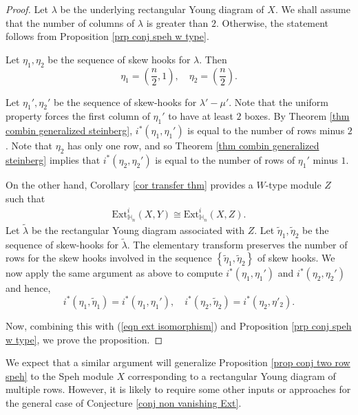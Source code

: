 \documentclass[11pt]{amsart}
\numberwithin{equation}{section}
\theoremstyle{definition}
\begin{document}
\begin{proof}
Let $\lambda$ be the underlying rectangular Young diagram of $X$. We shall assume that the number of columns of \(\lambda\) is greater than $2$. Otherwise, the statement follows from Proposition \ref{prp conj speh w type}.

Let $\eta_1, \eta_2$ be the sequence of skew hooks for $\lambda$. Then 
\[ \eta_1=(\frac{n}{2},1 ), \quad \eta_2=(\frac{n}{2} ) . \]


Let $\eta_1', \eta_2'$ be the sequence of skew-hooks for $\lambda'-\mu'$. Note that the uniform property forces the first column of $\eta_1'$ to have at least $2$ boxes. By Theorem \ref{thm combin generalized steinberg}, $i^*(\eta_1, \eta_1')$ is equal to the number of rows minus $2$. Note that $\eta_2$ has only one row, and so Theorem \ref{thm combin generalized steinberg} implies that $i^*(\eta_2, \eta_2')$ is equal to the number of rows of \(\eta_1'\) minus $1$. 

On the other hand, Corollary \ref{cor transfer thm} provides a $W$-type module $Z$ such that 
\begin{eqnarray} \label{eqn ext isomorphism}
\mathrm{Ext}^i_{\mathbb H_n}(X, Y) \cong \mathrm{Ext}^i_{\mathbb H_n}(X, Z) . 
\end{eqnarray}
Let $\widetilde{\lambda}$ be the rectangular Young diagram associated with $Z$. Let $\widetilde{\eta}_1, \widetilde{\eta}_2$ be the sequence of skew-hooks for $\widetilde{\lambda}$. The elementary transform preserves the number of rows for the skew hooks involved in the sequence $\left\{ \widetilde{\eta}_1, \widetilde{\eta}_2\right\}$ of skew hooks. We now apply the same argument as above to compute \(i^*(\eta_1, \eta_1')\) and \(i^*(\eta_2, \eta_2')\) and hence, 
\[  i^*(\eta_1, \widetilde{\eta}_1) =i^*(\eta_1, \eta_1'), \quad i^*(\eta_2, \widetilde{\eta}_2)=i^*(\eta_2, \eta'_2) .
\]

Now, combining this with (\ref{eqn ext isomorphism}) and Proposition \ref{prp conj speh w type}, we prove the proposition.
\end{proof}



We expect that a similar argument will generalize Proposition \ref{prop conj two row speh} to the Speh module $X$ corresponding to a rectangular Young diagram of multiple rows. However, it is likely to require some other inputs or approaches for the general case of Conjecture \ref{conj non vanishing Ext}.
\end{document}
